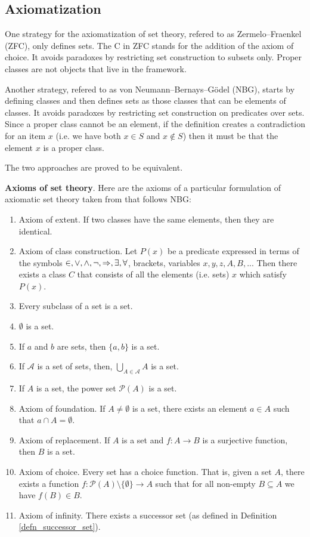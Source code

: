 \documentclass{article}
\newcommand{\marginleft}[1] {\reversemarginpar\marginpar{#1}}
\begin{document}
\subsection{Axiomatization}

One strategy for the axiomatization of set theory, refered to as Zermelo–Fraenkel (ZFC), only defines sets. The C in ZFC stands for the addition of the axiom of choice. It avoids paradoxes by restricting set construction to subsets only. Proper classes are not objects that live in the framework.

Another strategy, refered to as von Neumann–Bernays–Gödel (NBG), starts by defining classes and then defines sets as those classes that can be elements of classes. It avoids paradoxes by restricting set construction on predicates over sets. Since a proper class cannot be an element, if the definition creates a contradiction for an item $x$ (i.e. we have both $x \in S$ and $x \notin S$) then it must be that the element $x$ is a proper class.

The two approaches are proved to be equivalent.

\textbf{Axioms of set theory}. Here \marginleft{Set theory axioms} are the axioms of a particular formulation of axiomatic set theory taken from \cite{pinter2014book} that follows NBG:
\begin{enumerate}
	\item Axiom of extent. If two classes have the same elements, then they are identical.
	\item Axiom of class construction. Let $P(x)$ be a predicate expressed in terms of the symbols $\in, \vee, \wedge, \neg, \Rightarrow, \exists, \forall$, brackets, variables $x, y, z, A, B, ...$ Then there exists a class $C$ that consists of all the elements (i.e. sets) $x$ which satisfy $P(x)$.
	\item Every subclass of a set is a set.
	\item $\emptyset$ is a set.
	\item If $a$ and $b$ are sets, then $\{a, b\}$ is a set.
	\item If $\mathcal{A}$ is a set of sets, then, $\bigcup\limits_{A \in \mathcal{A}} A$ is a set.
	\item If $A$ is a set, the power set $\mathcal{P}(A)$ is a set.
	\item Axiom of foundation. If $A \neq \emptyset$ is a set, there exists an element $a \in A$ such that $a \cap A = \emptyset$.
	\item Axiom of replacement. If $A$ is a set and $f : A \to B$ is a surjective function, then $B$ is a set.
	\item Axiom of choice. Every set has a choice function. That is, given a set $A$, there exists a function $f : \mathcal{P}(A) \setminus \{ \emptyset \} \to A$ such that for all non-empty $B \subseteq A$ we have $f(B) \in B$.
	\item Axiom of infinity. There exists a successor set (as defined in Definition \ref{defn_successor_set}).
\end{enumerate}
\end{document}
